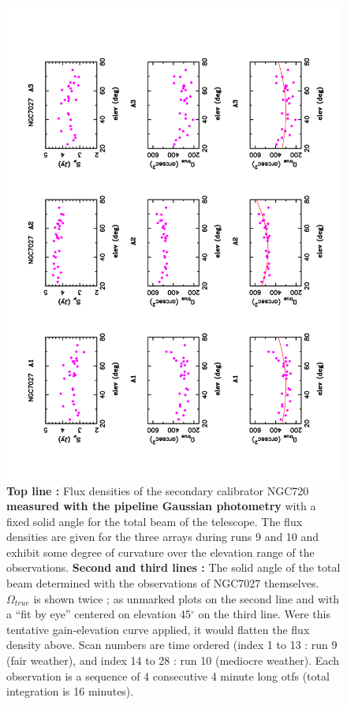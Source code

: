 \begin{figure}[p]
\begin{center}
  \includegraphics[clip, angle=-90, scale=0.6]{Figures/Flux_gain_curve_NGC7027}
  \caption{{\bf Top line :} Flux densities of the secondary calibrator NGC720 {\bf measured with the pipeline Gaussian photometry}
    with a fixed solid angle
    for the total beam of the telescope. The flux densities are given for the three arrays during runs 9 and 10  and  
    exhibit some degree of curvature over the elevation range of the observations.
    {\bf Second and third lines :} The solid angle of the total beam determined with the observations of NGC7027 themselves. $\Omega_{true}$
    is shown twice ; 
    as  unmarked plots on the second line and with  a ``fit by eye''  centered on  elevation 45$^{\circ}$ on the third line.
    Were this tentative gain-elevation curve applied, it  would flatten the flux density above.  
    Scan numbers are time ordered (index 1 to 13 : run 9 (fair weather), and index 14 to 28 : run 10 (mediocre weather).
    Each observation is a sequence of 4 consecutive 4 minute long otfs (total integration is 16 minutes).
}

\label{fig:gain_curve_NG7027}
\end{center}
\end{figure}


















